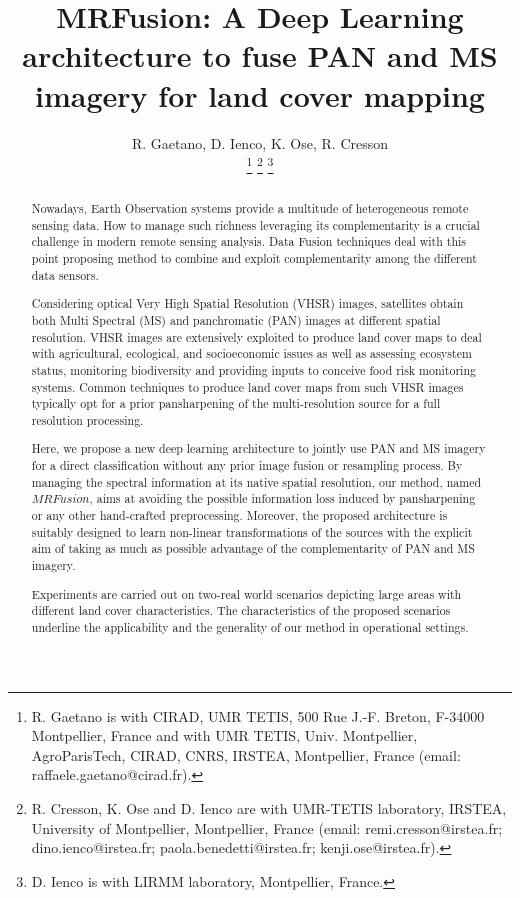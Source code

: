 \documentclass[journal]{IEEEtran}
\newcommand{\method}{$MRFusion$}
\begin{document}
\title{MRFusion: A Deep Learning architecture to fuse PAN and MS imagery for land cover mapping}


\author{R. Gaetano,
        D. Ienco,
        K. Ose,
        R. Cresson


\thanks{R. Gaetano is with CIRAD, UMR TETIS, 500 Rue J.-F. Breton, F-34000 Montpellier, France and with UMR TETIS, Univ. Montpellier, AgroParisTech, CIRAD, CNRS, IRSTEA, Montpellier, France (email: raffaele.gaetano@cirad.fr).}
\thanks{R. Cresson, K. Ose and D. Ienco are with UMR-TETIS laboratory, IRSTEA, University of Montpellier, Montpellier, France (email: remi.cresson@irstea.fr; dino.ienco@irstea.fr; paola.benedetti@irstea.fr; kenji.ose@irstea.fr).}
\thanks{D. Ienco is with LIRMM laboratory, Montpellier, France.} }

\maketitle

\begin{abstract}
Nowadays, Earth Observation systems provide a multitude of heterogeneous remote sensing data. How to manage such richness leveraging its complementarity is a crucial challenge in modern remote sensing analysis. Data Fusion techniques deal with this point proposing method to combine and exploit complementarity among the different data sensors.

Considering optical Very High Spatial Resolution (VHSR) images, satellites obtain both Multi Spectral (MS) and panchromatic (PAN) images at different spatial resolution. VHSR images are extensively exploited to produce land cover maps to deal with agricultural, ecological, and socioeconomic issues as well as assessing ecosystem status, monitoring biodiversity and providing inputs to conceive food risk monitoring systems. Common techniques to produce land cover maps from such VHSR images typically opt for a prior pansharpening of the multi-resolution source for a full resolution processing.

Here, we propose a new deep learning architecture to jointly use PAN and MS imagery for a direct classification without any prior image fusion or resampling process. By managing the spectral information at its native spatial resolution, our method, named \method{}, aims at avoiding the possible information loss induced by pansharpening or any other hand-crafted preprocessing. Moreover, the proposed architecture is suitably designed to learn non-linear transformations of the sources with the explicit aim of taking as much as possible advantage of the complementarity of PAN and MS imagery.%

Experiments are carried out on two-real world scenarios depicting large areas with different land cover characteristics. The characteristics of the proposed scenarios underline the applicability and the generality of our method in operational settings.
\end{abstract}
\end{document}
